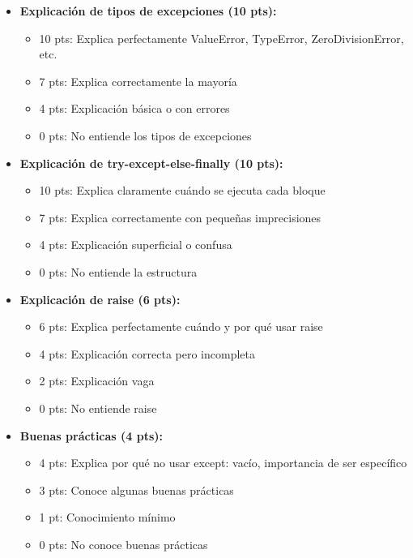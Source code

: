 \documentclass[12pt,a4paper]{article}
\begin{document}
\begin{itemize}[leftmargin=*]
    \item \textbf{Explicación de tipos de excepciones (10 pts):}
    \begin{itemize}
        \item 10 pts: Explica perfectamente ValueError, TypeError, ZeroDivisionError, etc.
        \item 7 pts: Explica correctamente la mayoría
        \item 4 pts: Explicación básica o con errores
        \item 0 pts: No entiende los tipos de excepciones
    \end{itemize}
    
    \item \textbf{Explicación de try-except-else-finally (10 pts):}
    \begin{itemize}
        \item 10 pts: Explica claramente cuándo se ejecuta cada bloque
        \item 7 pts: Explica correctamente con pequeñas imprecisiones
        \item 4 pts: Explicación superficial o confusa
        \item 0 pts: No entiende la estructura
    \end{itemize}
    
    \item \textbf{Explicación de raise (6 pts):}
    \begin{itemize}
        \item 6 pts: Explica perfectamente cuándo y por qué usar raise
        \item 4 pts: Explicación correcta pero incompleta
        \item 2 pts: Explicación vaga
        \item 0 pts: No entiende raise
    \end{itemize}
    
    \item \textbf{Buenas prácticas (4 pts):}
    \begin{itemize}
        \item 4 pts: Explica por qué no usar except: vacío, importancia de ser específico
        \item 3 pts: Conoce algunas buenas prácticas
        \item 1 pt: Conocimiento mínimo
        \item 0 pts: No conoce buenas prácticas
    \end{itemize}
\end{itemize}
\end{document}
